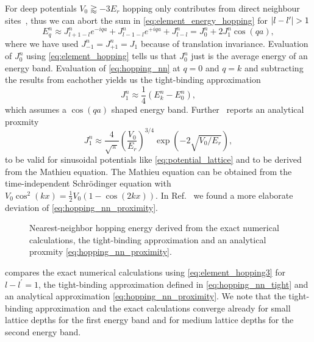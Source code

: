 For deep potentials $V_0\gtrapprox-3E_r$ hopping only contributes from direct
neighbour sites~\cite{Rom2009}, thus we can abort the sum in
\cref{eq:element_energy_hopping} for $\abs{l-l^\prime}>1$
\begin{equation}
  E^n_q
  \approx J^n_{l+1-l}e^{-iqa}+J^n_{l-1-l}e^{+iqa}+J^n_{l-l}
  =J^n_0+2J^n_1\cos(qa)
  \label{eq:hopping_nn},
\end{equation}
where we have used $J^n_{-1}=J^n_{+1}=J_1$ because of translation invariance.
Evaluation of $J^n_0$ using \cref{eq:element_hopping} tells us that $J^n_0$
just is the average energy of an energy band. Evaluation of
\cref{eq:hopping_nn} at $q=0$ and $q=k$ and subtracting the results from
eachother yields us the tight-binding approximation
\begin{equation}
  J^n_1\approx\frac{1}{4}\left(E^n_k-E^n_0\right)
  \label{eq:hopping_nn_tight},
\end{equation}
which assumes a $\cos(qa)$ shaped energy band. Further~\cite{Bloch2008}
reports an analytical proxmity
\begin{equation}
  J^n_1\approx
  \frac{4}{\sqrt{\pi}}\left(\frac{V_0}{E_r}\right)^{3/4}\exp(-2\sqrt{V_0/E_r})
  \label{eq:hopping_nn_proximity},
\end{equation}
to be valid for sinusoidal potentials like \cref{eq:potential_lattice} and
to be derived from the Mathieu equation. The Mathieu equation can be obtained
from the time-independent Schrödinger equation with
$V_0\cos^2(kx)=\frac{1}{2}V_0\left(1-\cos(2kx)\right)$.
In Ref.~\cite{Connor1984} we found a more elaborate deviation of
\cref{eq:hopping_nn_proximity}.
\begin{figure}[htb]
  \centering
  \begin{adjustbox}{width=\textwidth}
    
  \end{adjustbox}
  \caption{Nearest-neighbor hopping energy derived from the exact numerical
    calculations, the tight-binding approximation and an analytical proxmity
    \cref{eq:hopping_nn_proximity}.
  }\label{fig:scale_hopping_nn}
\end{figure}
 compares the exact numerical calculations using
\cref{eq:element_hopping3} for $l-l^\prime=1$, the tight-binding approximation
defined in \cref{eq:hopping_nn_tight} and an analytical approximation
\cref{eq:hopping_nn_proximity}. We note that the tight-binding approximation
and the exact calculations converge already for small lattice depths for the
first energy band and for medium lattice depths for the second energy band.
